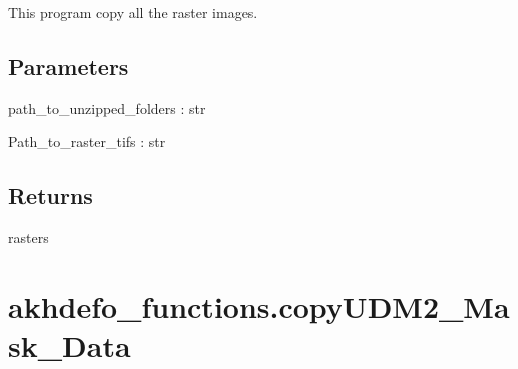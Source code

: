 \documentclass[letterpaper,10pt]{sphinxmanual}
\begin{document}
\begin{fulllineitems}
\label{\detokenize{generated/akhdefo_functions.copyImage_Data:akhdefo_functions.copyImage_Data}}
\pysigstartsignatures
{}
\pysigstopsignatures
\sphinxAtStartPar
This program copy all the raster images.


\section{Parameters}
\label{\detokenize{generated/akhdefo_functions.copyImage_Data:parameters}}
\sphinxAtStartPar
path\_to\_unzipped\_folders : str

\sphinxAtStartPar
Path\_to\_raster\_tifs : str


\section{Returns}
\label{\detokenize{generated/akhdefo_functions.copyImage_Data:returns}}
\sphinxAtStartPar
rasters

\end{fulllineitems}


\sphinxstepscope


\chapter{akhdefo\_functions.copyUDM2\_Mask\_Data}
\label{\detokenize{generated/akhdefo_functions.copyUDM2_Mask_Data:akhdefo-functions-copyudm2-mask-data}}\label{\detokenize{generated/akhdefo_functions.copyUDM2_Mask_Data::doc}}
\end{document}

